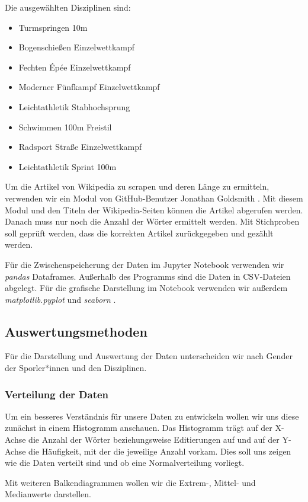 \documentclass[11pt]{article}
\begin{document}
Die ausgewählten Disziplinen sind:
\begin{itemize}
\item Turmspringen 10m
\item Bogenschießen Einzelwettkampf
\item Fechten Épée Einzelwettkampf
\item Moderner Fünfkampf Einzelwettkampf
\item Leichtathletik Stabhochsprung
\item Schwimmen 100m Freistil
\item Radsport Straße Einzelwettkampf
\item Leichtathletik Sprint 100m
\end{itemize}

Um die Artikel von Wikipedia zu scrapen und deren Länge zu ermitteln, verwenden wir ein Modul von GitHub-Benutzer Jonathan Goldsmith \parencite{goldsmith}. Mit diesem Modul und den Titeln der Wikipedia-Seiten können die Artikel abgerufen werden. Danach muss nur noch die Anzahl der Wörter ermittelt werden. Mit Stichproben soll geprüft werden, dass die korrekten Artikel zurückgegeben und gezählt werden.

Für die Zwischenspeicherung der Daten im Jupyter Notebook verwenden wir \textit{pandas} Dataframes. Außerhalb des Programms sind die Daten in CSV-Dateien abgelegt. Für die grafische Darstellung im Notebook verwenden wir außerdem \textit{matplotlib.pyplot} \parencite{matplotlib} und \textit{seaborn} \parencite{seaborn}.

\subsection{Auswertungsmethoden}
Für die Darstellung und Auswertung der Daten unterscheiden wir nach Gender der Sporler*innen und den Disziplinen.

\subsubsection{Verteilung der Daten}
Um ein besseres Verständnis für unsere Daten zu entwickeln wollen wir uns diese zunächst in einem Histogramm anschauen. Das Histogramm trägt auf der X-Achse die Anzahl der Wörter beziehungsweise Editierungen auf und auf der Y-Achse die Häufigkeit, mit der die jeweilige Anzahl vorkam. Dies soll uns zeigen wie die Daten verteilt sind und ob eine Normalverteilung vorliegt.

Mit weiteren Balkendiagrammen wollen wir die Extrem-, Mittel- und Medianwerte darstellen.
\end{document}
